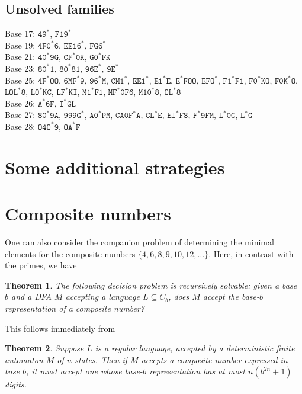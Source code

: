 \documentclass[12pt]{article}
\theoremstyle{plain}
\newtheorem{theorem}{Theorem}
\theoremstyle{definition}
\theoremstyle{remark}
\newcommand{\0}{\mathtt{0}}
\newcommand{\1}{\mathtt{1}}
\newcommand{\2}{\mathtt{2}}
\newcommand{\3}{\mathtt{3}}
\newcommand{\4}{\mathtt{4}}
\newcommand{\5}{\mathtt{5}}
\newcommand{\6}{\mathtt{6}}
\newcommand{\7}{\mathtt{7}}
\newcommand{\8}{\mathtt{8}}
\newcommand{\9}{\mathtt{9}}
\begin{document}
\subsection{Unsolved families}
Base 17: $\mathtt{49^*}$, $\mathtt{F19^*}$ \\
Base 19: $\mathtt{4F0^*6}$, $\mathtt{EE16^*}$, $\mathtt{FG6^*}$ \\
Base 21: $\mathtt{40^*9G}$, $\mathtt{CF^*0K}$, $\mathtt{G0^*FK}$ \\
Base 23: $\mathtt{80^*1}$, $\mathtt{80^*81}$, $\mathtt{96E^*}$, $\mathtt{9E^*}$ \\
Base 25: $\mathtt{4F^*OO}$, $\mathtt{6MF^*9}$, $\mathtt{96^*M}$, $\mathtt{CM1^*}$, $\mathtt{EE1^*}$, $\mathtt{E1^*E}$, $\mathtt{E^*FOO}$, $\mathtt{EFO^*}$, $\mathtt{F1^*F1}$, $\mathtt{F0^*KO}$, $\mathtt{F0K^*O}$, $\mathtt{LOL^*8}$, $\mathtt{LO^*KC}$, $\mathtt{LF^*KI}$, $\mathtt{M1^*F1}$, $\mathtt{MF^*0F6}$, $\mathtt{M10^*8}$, $\mathtt{OL^*8}$ \\
Base 26: $\mathtt{A^*6F}$, $\mathtt{I^*GL}$ \\
Base 27: $\mathtt{80^*9A}$, $\mathtt{999G^*}$, $\mathtt{A0^*PM}$, $\mathtt{CA0F^*A}$, $\mathtt{CL^*E}$, $\mathtt{EI^*F8}$, $\mathtt{F^*9FM}$, $\mathtt{L^*0G}$, $\mathtt{L^*G}$ \\
Base 28: $\mathtt{O4O^*9}$, $\mathtt{OA^*F}$

\section{Some additional strategies}

\section{Composite numbers}

One can also consider the companion problem of determining the
minimal elements for the composite numbers
$\lbrace 4,6,8,9,10, 12, \ldots \rbrace $.  
Here, in contrast with the primes, we have

\begin{theorem}
The following decision problem is recursively solvable:  given
a base $b$ and a DFA $M$ accepting a language $L \subseteq 
C_b$, does $M$ accept the base-$b$ representation of a composite 
number?
\end{theorem}

This follows immediately from

\begin{theorem}
Suppose $L$ is a regular language, accepted by a 
deterministic finite automaton $M$ of $n$ states.  Then
if $M$ accepts a composite number expressed in base $b$, it must
accept one whose base-$b$ representation has at most
$n(b^{2n} + 1)$ digits.
\end{theorem}
\end{document}
